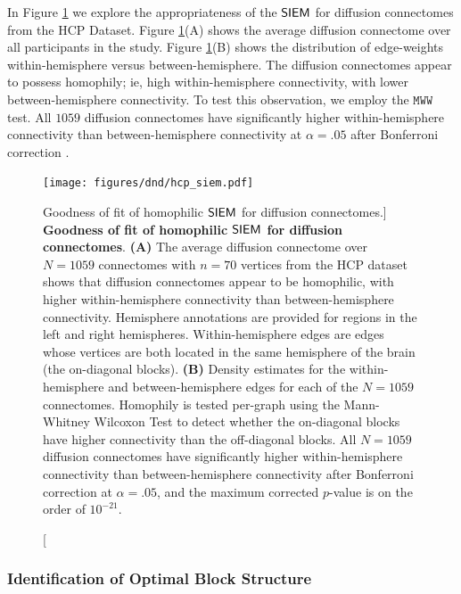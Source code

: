 In Figure \ref{fig:siem_os_mri} we explore the appropriateness of the $\operatorname{\mathsf{SIEM}}$ for diffusion connectomes from the HCP Dataset. Figure \ref{fig:siem_os_mri}(A) shows the average diffusion connectome over all participants in the study. Figure \ref{fig:siem_os_mri}(B) shows the distribution of edge-weights within-hemisphere versus between-hemisphere. The diffusion connectomes appear to possess homophily; ie, high within-hemisphere connectivity, with lower between-hemisphere connectivity. To test this observation, we employ the $\texttt{MWW}$ test. All $1059$ diffusion connectomes have significantly higher within-hemisphere connectivity than between-hemisphere connectivity at $\alpha=.05$ after Bonferroni correction \cite{Bonferroni1936-ip}.

\begin{figure}
    \centering
    \texttt{[image: figures/dnd/hcp\_siem.pdf]}
    \caption
    [Goodness of fit of homophilic $\operatorname{\mathsf{SIEM}}$ for diffusion connectomes.]
    {\textbf{Goodness of fit of homophilic $\operatorname{\mathsf{SIEM}}$ for diffusion connectomes}. \textbf{(A)} The average diffusion connectome over $N=1059$ connectomes with $n=70$ vertices from the HCP dataset shows that diffusion connectomes appear to be homophilic, with higher within-hemisphere connectivity than between-hemisphere connectivity. Hemisphere annotations are provided for regions in the left and right hemispheres. Within-hemisphere edges are edges whose vertices are both located in the same hemisphere of the brain (the on-diagonal blocks). \textbf{(B)} Density estimates for the within-hemisphere and between-hemisphere edges for each of the $N=1059$ connectomes. Homophily is tested per-graph using the Mann-Whitney Wilcoxon Test to detect whether the on-diagonal blocks have higher connectivity than the off-diagonal blocks. All $N=1059$ diffusion connectomes have significantly higher within-hemisphere connectivity than between-hemisphere connectivity after Bonferroni correction at $\alpha=.05$, and the maximum corrected $p$-value is on the order of $10^{-21}$.}
    \label{fig:siem_os_mri}
\end{figure}

\subsubsection{Identification of Optimal Block Structure}\label{sec:sbm_est_wt}

